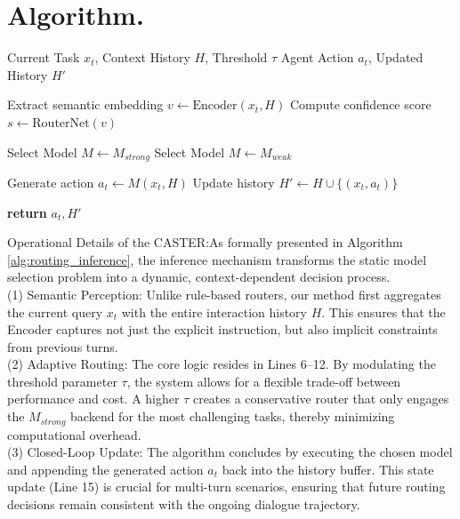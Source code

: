 \documentclass{article}
\theoremstyle{plain}
\theoremstyle{definition}
\theoremstyle{remark}
\begin{document}
\section{Algorithm.}
\label{app:alg}
\begin{center}   %
\begin{minipage}{0.98\linewidth}  %
\begin{algorithm}[H]
  \caption{Context-Aware Strategy for Task Efficient Routing Inference}
  \label{alg:routing_inference}
  \begin{algorithmic}
     Current Task $x_t$, Context History $H$, Threshold $\tau$
     Agent Action $a_t$, Updated History $H'$
    
    \STATE {}
    \STATE Extract semantic embedding $v \leftarrow \text{Encoder}(x_t, H)$
    \STATE Compute confidence score $s \leftarrow \text{RouterNet}(v)$
    
        \STATE {}
        \STATE Select Model $M \leftarrow M_{strong}$
    \ELSE
        \STATE {}
        \STATE Select Model $M \leftarrow M_{weak}$
    \ENDIF
    
    \STATE {}
    \STATE Generate action $a_t \leftarrow M(x_t, H)$
    \STATE Update history $H' \leftarrow H \cup \{(x_t, a_t)\}$
    
    \STATE \textbf{return} $a_t, H'$
  \end{algorithmic}
\end{algorithm}
Operational Details of the CASTER:As formally presented in Algorithm \ref{alg:routing_inference}, the inference mechanism transforms the static model selection problem into a dynamic, context-dependent decision process.\\(1) Semantic Perception: Unlike rule-based routers, our method first aggregates the current query $x_t$ with the entire interaction history $H$. This ensures that the Encoder captures not just the explicit instruction, but also implicit constraints from previous turns.\\(2) Adaptive Routing: The core logic resides in Lines 6–12. By modulating the threshold parameter $\tau$, the system allows for a flexible trade-off between performance and cost. A higher $\tau$ creates a conservative router that only engages the $M_{strong}$ backend for the most challenging tasks, thereby minimizing computational overhead.\\(3) Closed-Loop Update: The algorithm concludes by executing the chosen model and appending the generated action $a_t$ back into the history buffer. This state update (Line 15) is crucial for multi-turn scenarios, ensuring that future routing decisions remain consistent with the ongoing dialogue trajectory.
\end{minipage}
\end{center}
\end{document}
